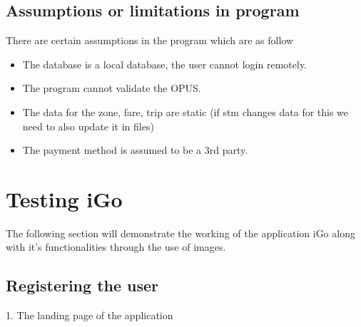 \documentclass[a4paper,12pt]{article}
\begin{document}
\subsection{Assumptions or limitations in program}
There are certain assumptions in the program which are as follow
\begin{itemize}[noitemsep]
    \item The database is a local database, the user cannot login remotely.
    \item The program cannot validate the OPUS.
    \item The data for the zone, fare, trip are static (if stm changes data for this we need to also update it in files)
    \item The payment method is assumed to be a 3rd party.
\end{itemize}

\newpage
\section{Testing iGo}
\par
The following section will demonstrate the working of the application iGo along with it's functionalities through the use of images.
\subsection{Registering the user}

\begin{center}
\caption{1. The landing page of the application}
\end{center}
\end{document}

